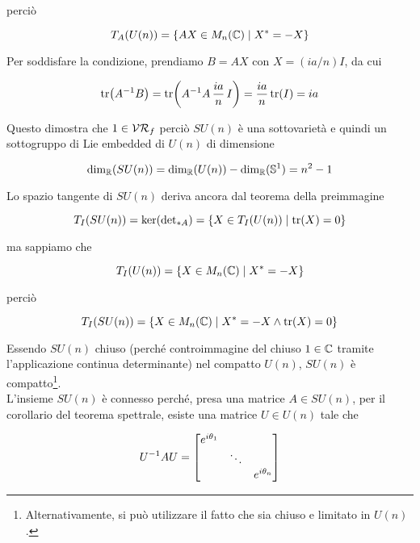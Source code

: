 perciò

\begin{equation}
	T_{A}(U(n)) = \{ AX \in M_{n}(\mathbb{C}) \mid X^{*} = -X \}
\end{equation}

Per soddisfare la condizione, prendiamo $ B = AX $ con $ X = (i a/n) I $, da cui

\begin{equation}
	\tr(A^{-1} B) = \tr(A^{-1} A \, \dfrac{ia}{n} \, I) %
	= \dfrac{ia}{n} \tr(I) %
	= i a
\end{equation}

Questo dimostra che $ 1 \in \mathcal{VR}_{f} $ perciò $ SU(n) $ è una sottovarietà e quindi un sottogruppo di Lie embedded di $ U(n) $ di dimensione

\begin{equation}
	\dim_{\mathbb{R}}(SU(n)) = \dim_{\mathbb{R}}(U(n)) - \dim_{\mathbb{R}}(\mathbb{S}^{1}) = n^{2} - 1
\end{equation}

Lo spazio tangente di $ SU(n) $ deriva ancora dal teorema della preimmagine

\begin{equation}
	T_{I}(SU(n)) = \ker({\det}_{*A}) %
	= \{ X \in T_{I}(U(n)) \mid \tr(X) = 0 \}
\end{equation}

ma sappiamo che

\begin{equation}
	T_{I}(U(n)) = \{ X \in M_{n}(\mathbb{C}) \mid X^{*} = - X \}
\end{equation}

perciò

\begin{equation}
	T_{I}(SU(n)) = \{ X \in M_{n}(\mathbb{C}) \mid X^{*} = -X \wedge \tr(X) = 0 \}
\end{equation}

Essendo $ SU(n) $ chiuso (perché controimmagine del chiuso $ 1 \in \mathbb{C} $ tramite l'applicazione continua determinante) nel compatto $ U(n) $, $ SU(n) $ è compatto\footnote{%
	Alternativamente, si può utilizzare il fatto che sia chiuso e limitato in $ U(n) $.%
}.\\
L'insieme $ SU(n) $ è connesso perché, presa una matrice $ A \in SU(n) $, per il corollario del teorema spettrale, esiste una matrice $ U \in U(n) $ tale che

\begin{equation}
	U^{-1} A U = %
	\bmqty{ %
			\dmat{ %
			 		e^{i \theta_{1}}, %
			 		\ddots, %
			 		e^{i \theta_{n}} %
		 			} %
	 		}
\end{equation}

